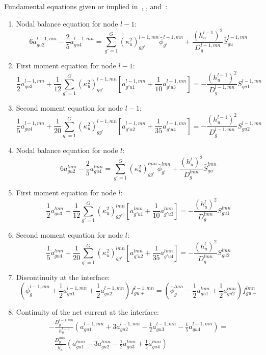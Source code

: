 Fundamental equations given or implied in~\cite{GehinPhD}, \cite{SmithMS}, and~\cite{Smith1983Nonlinear}:
\begin{enumerate}
    \item Nodal balance equation for node $l-1$:
        \[
        6a_{gu2}^{l-1,mn}-\frac{2}{5}a_{gu4}^{l-1,mn}=\sum_{g'=1}^G(\kappa_u^2)_{gg'}^{l-1,mn}\bar{\phi}_{g'}^{l-1,mn}+\frac{(h_u^{l-1})^2}{D_g^{l-1,mn}}\bar{S}_{gu}^{l-1,mn}
        \]
    \item First moment equation for node $l-1$:
        \[
        \frac{1}{2}a_{gu3}^{l-1,mn}+\frac{1}{12}\sum_{g'=1}^G(\kappa_u^2)_{gg'}^{l-1,mn}\left[a_{g'u1}^{l-1,mn}+\frac{1}{10}a_{g'u3}^{l-1,mn}\right]=-\frac{(h_u^{l-1})^2}{D_g^{l-1,mn}}S_{gu1}^{l-1,mn}
        \]
    \item Second moment equation for node $l-1$:
        \[
        \frac{1}{5}a_{gu4}^{l-1,mn}+\frac{1}{20}\sum_{g'=1}^G(\kappa_u^2)_{gg'}^{l-1,mn}\left[a_{g'u2}^{l-1,mn}+\frac{1}{35}a_{g'u4}^{l-1,mn}\right]=-\frac{(h_u^{l-1})^2}{D_g^{l-1,mn}}S_{gu2}^{l-1,mn}
        \]
    \item Nodal balance equation for node $l$:
        \[
        6a_{gu2}^{lmn}-\frac{2}{5}a_{gu4}^{lmn}=\sum_{g'=1}^G(\kappa_u^2)_{gg'}^{lmn}\bar{\phi}_{g'}^{lmn}+\frac{(h_u^{l})^2}{D_g^{lmn}}\bar{S}_{gu}^{lmn}
        \]
    \item First moment equation for node $l$:
        \[
        \frac{1}{2}a_{gu3}^{lmn}+\frac{1}{12}\sum_{g'=1}^G(\kappa_u^2)_{gg'}^{lmn}\left[a_{g'u1}^{lmn}+\frac{1}{10}a_{g'u3}^{lmn}\right]=-\frac{(h_u^{l})^2}{D_g^{lmn}}S_{gu1}^{lmn}
        \]
    \item Second moment equation for node $l$:
        \[
        \frac{1}{5}a_{gu4}^{lmn}+\frac{1}{20}\sum_{g'=1}^G(\kappa_u^2)_{gg'}^{lmn}\left[a_{g'u2}^{lmn}+\frac{1}{35}a_{g'u4}^{lmn}\right]=-\frac{(h_u^{l})^2}{D_g^{lmn}}S_{gu2}^{lmn}
        \]
    \item Discontinuity at the interface:
        \[
        \left(\bar{\phi}_{g}^{l-1,mn}+\frac{1}{2}a_{gu1}^{l-1,mn}+\frac{1}{2}a_{gu2}^{l-1,mn}\right)f_{gu+}^{l-1,mn}=\left(\bar{\phi}_{g}^{lmn}-\frac{1}{2}a_{gu1}^{lmn}+\frac{1}{2}a_{gu2}^{lmn}\right)f_{gu-}^{lmn}
        \]
    \item Continuity of the net current at the interface:
        \begin{multline*}
        -\frac{D_g^{l-1,mn}}{h_u^{l-1}}\left(a_{gu1}^{l-1,mn}+3a_{gu2}^{l-1,mn}-\frac{1}{2}a_{gu3}^{l-1,mn}-\frac{1}{5}a_{gu4}^{l-1,mn}\right)=\\
        -\frac{D_g^{lmn}}{h_u^{l}}\left(a_{gu1}^{lmn}-3a_{gu2}^{lmn}-\frac{1}{2}a_{gu3}^{lmn}+\frac{1}{5}a_{gu4}^{lmn}\right)
        \end{multline*}
\end{enumerate}

